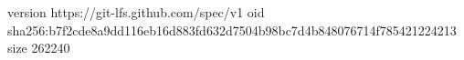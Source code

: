 version https://git-lfs.github.com/spec/v1
oid sha256:b7f2cde8a9dd116eb16d883fd632d7504b98bc7d4b848076714f785421224213
size 262240
